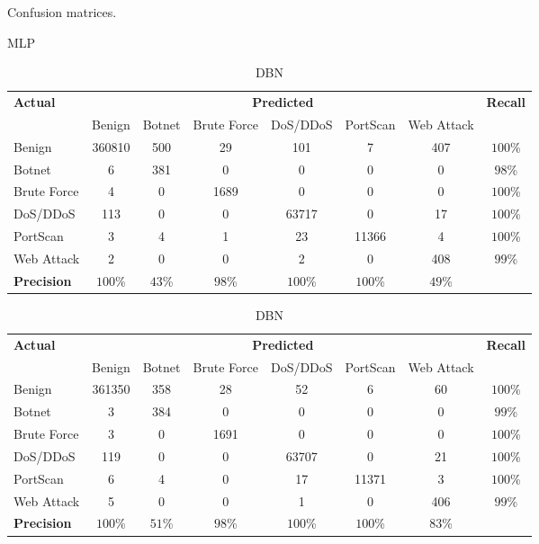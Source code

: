 \documentclass[runningheads]{llncs}
\begin{document}
\begin{table}[ht]
    \caption{Confusion matrices.}
    \label{tab:confusion_matrix_eval}
    \begin{subtable}[ht]{\textwidth}
        \centering
        \caption{MLP}
        \label{subtab:mlp_confusion_matrix}
        \begin{tabular}[t]{lccccccc}
        \toprule
        \bf Actual & \multicolumn{6}{c}{\bf Predicted} & \bf Recall\\ 
        \cmidrule{2-7} &
        Benign & Botnet & Brute Force & DoS/DDoS & PortScan & Web Attack & \\\midrule
        Benign      & 360810  & 500  & 29   & 101    & 7      & 407  & $100$\%\\
        Botnet & 6       & 381  & 0    & 0      & 0      & 0    & $98$\% \\
        Brute Force & 4       & 0    & 1689 & 0      & 0      & 0    & $100$\%\\
        DoS/DDoS    & 113     & 0    & 0    & 63717  & 0      & 17   & $100$\%\\
        PortScan    & 3       & 4    & 1    & 23     & 11366  & 4    & $100$\%\\
        Web Attack  & 2       & 0    & 0    & 2      & 0      & 408  & $99$\%\\\midrule
        \bf Precision & $100$\% & $43$\% & $98$\% & $100$\%  & $100$\%  & $49$\% & \\
        \bottomrule
        \end{tabular}
    \end{subtable}
    \hfill
    \begin{subtable}[ht]{\textwidth}
        \centering
        \caption{DBN}
        \label{subtab:dbn_confusion_matrix}
        \begin{tabular}[t]{lccccccc}
        \toprule
        \bf Actual & \multicolumn{6}{c}{\bf Predicted} & \bf Recall\\ 
        \cmidrule{2-7} &
        Benign & Botnet & Brute Force & DoS/DDoS & PortScan & Web Attack & \\\midrule
        Benign      & 361350  & 358  & 28   & 52     & 6      & 60   & $100$\%\\
        Botnet & 3       & 384  & 0    & 0      & 0      & 0    & $99$\% \\
        Brute Force & 3       & 0    & 1691 & 0      & 0      & 0    & $100$\%\\
        DoS/DDoS    & 119     & 0    & 0    & 63707  & 0      & 21   & $100$\%\\
        PortScan    & 6       & 4    & 0    & 17     & 11371  & 3    & $100$\%\\
        Web Attack  & 5       & 0    & 0    & 1      & 0      & 406  & $99$\% \\\midrule
        \bf Precision   & $100$\%   & $51$\% & $98$\% & $100$\%  & $100$\%  & $83$\% & \\
        \bottomrule
        \end{tabular}
    \end{subtable}
\end{table}
\end{document}
